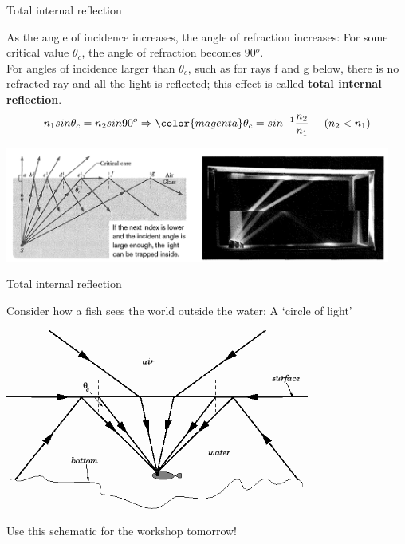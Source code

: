 \begin{frame}{Total internal reflection}

As the angle of incidence increases, the angle of refraction
increases: For some critical value $\theta_c$, the angle of refraction
becomes 90$^o$.\\
\vspace{0.1cm}
For angles of incidence larger than $\theta_c$, such as for rays f and
g below, there is no refracted ray and all the light is reflected;
this effect is called {\bf total internal reflection}.\\
\begin{equation*}
       n_1 sin\theta_c = n_2 sin90^o \Rightarrow
       {\color{magenta}\theta_c = sin^{-1} \frac{n_2}{n_1}}\;\;\;\;\;(n_2 < n_1)
\end{equation*}

\begin{center}
    \includegraphics[width=0.95\textwidth]{./images/schematics/total_internal_reflection}\\
\end{center}

\end{frame}

%
%
%

\begin{frame}{Total internal reflection}

Consider how a fish sees the world outside the water: A `circle of light'

\begin{center}
    \includegraphics[width=0.75\textwidth]{./images/schematics/fish_view_circle_of_light}\\
\end{center}

Use this schematic for the workshop tomorrow!

\end{frame}

